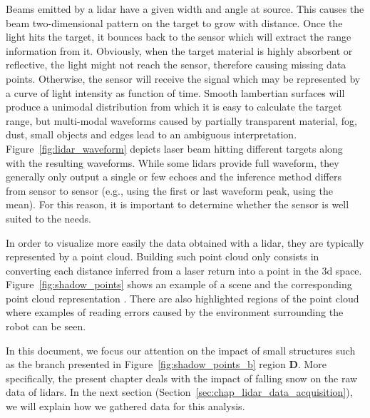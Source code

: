 Beams emitted by a \gls*{lidar} have a given width and angle at source. This causes the beam two-dimensional pattern on the target to grow with distance. Once the light hits the target, it bounces back to the sensor which will extract the range information from it. Obviously, when the target material is highly absorbent or reflective, the light might not reach the sensor, therefore causing missing data points. Otherwise, the sensor will receive the signal which may be represented by a curve of light intensity as function of time. Smooth lambertian surfaces will produce a unimodal distribution from which it is easy to calculate the target range, but multi-modal waveforms caused by partially transparent material, fog, dust, small objects and edges lead to an ambiguous interpretation. Figure~\ref{fig:lidar_waveform} depicts laser beam hitting different targets along with the resulting waveforms. While some \gls*{lidar}s provide full waveform, they generally only output a single or few echoes and the inference method differs from sensor to sensor (e.g., using the first or last waveform peak, using the mean). For this reason, it is important to determine whether the sensor is well suited to the needs. 

In order to visualize more easily the data obtained with a lidar, they are typically represented by a point cloud. Building such point cloud only consists in converting each distance inferred from a laser return into a point in the \gls*{3d} space. Figure~\ref{fig:shadow_points} shows an example of a scene  and the corresponding point cloud representation . There are also highlighted regions of the point cloud where examples of reading errors caused by the environment surrounding the robot can be seen. 

In this document, we focus our attention on the impact of small structures such as the branch presented in Figure~\ref{fig:shadow_points_b} region \textbf{D}. More specifically, the present chapter deals with the impact of falling snow on the raw data of \gls*{lidar}s. In the next section (Section~\ref{sec:chap_lidar_data_acquisition}), we will explain how we gathered data for this analysis.

